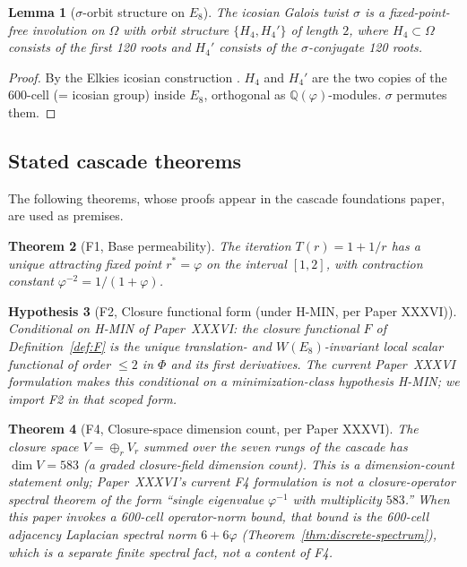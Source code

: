 \documentclass[11pt, a4paper]{amsart}
\newtheorem{theorem}{Theorem}[section]
\newtheorem{lemma}[theorem]{Lemma}
\newtheorem{hypothesis}[theorem]{Hypothesis}
\theoremstyle{definition}
\newcommand{\Q}{\mathbb{Q}}
\begin{document}
\begin{lemma}[$\sigma$-orbit structure on $E_8$]\label{lem:sigma}
The icosian Galois twist $\sigma$ is a fixed-point-free involution
on $\Omega$ with orbit structure $\{H_4, H_4'\}$ of length $2$, where
$H_4 \subset \Omega$ consists of the first 120 roots and $H_4'$ consists
of the $\sigma$-conjugate 120 roots.
\end{lemma}

\begin{proof}
By the Elkies icosian construction \cite{elkies}. $H_4$ and $H_4'$
are the two copies of the 600-cell (= icosian group) inside $E_8$,
orthogonal as $\Q(\varphi)$-modules. $\sigma$ permutes them.
\end{proof}

\subsection{Stated cascade theorems}

The following theorems, whose proofs appear in the cascade foundations
paper, are used as premises.

\begin{theorem}[F1, Base permeability]\label{thm:F1}
The iteration $T(r) = 1 + 1/r$ has a unique attracting fixed point
$r^* = \varphi$ on the interval $[1, 2]$, with contraction constant
$\varphi^{-2} = 1/(1+\varphi)$.
\end{theorem}

\begin{hypothesis}[F2, Closure functional form (under H-MIN, per Paper XXXVI)]\label{thm:F2}
\emph{Conditional on H-MIN of Paper~XXXVI:} the closure functional
$F$ of Definition~\ref{def:F} is the unique translation- and
$W(E_8)$-invariant local scalar functional of order $\leq 2$ in
$\Phi$ and its first derivatives. The current Paper~XXXVI
formulation makes this conditional on a minimization-class
hypothesis H-MIN; we import F2 in that scoped form.
\end{hypothesis}

\begin{theorem}[F4, Closure-space dimension count, per Paper XXXVI]\label{thm:F4}
The closure space $V = \oplus_r V_r$ summed over the seven rungs
of the cascade has $\dim V = 583$ (a graded closure-field dimension
count). \emph{This is a dimension-count statement only;}
Paper~XXXVI's current F4 formulation is \emph{not} a closure-operator
spectral theorem of the form ``single eigenvalue $\varphi^{-1}$
with multiplicity $583$.''  When this paper invokes a 600-cell
operator-norm bound, that bound is the 600-cell adjacency Laplacian
spectral norm $6+6\varphi$ (Theorem~\ref{thm:discrete-spectrum}),
which is a separate finite spectral fact, not a content of F4.
\end{theorem}
\end{document}
